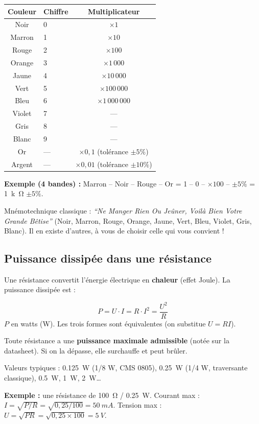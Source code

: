 \documentclass[12pt,a4paper,twoside]{book}
\begin{document}
\begin{center}
\begin{tabular}{clc}
\toprule
\textbf{Couleur} & \textbf{Chiffre} & \textbf{Multiplicateur} \\
\midrule
Noir & 0 & $\times 1$ \\
Marron & 1 & $\times 10$ \\
Rouge & 2 & $\times 100$ \\
Orange & 3 & $\times 1\,000$ \\
Jaune & 4 & $\times 10\,000$ \\
Vert & 5 & $\times 100\,000$ \\
Bleu & 6 & $\times 1\,000\,000$ \\
Violet & 7 & — \\
Gris & 8 & — \\
Blanc & 9 & — \\
Or & — & $\times 0{,}1$ (tolérance $\pm 5\%$) \\
Argent & — & $\times 0{,}01$ (tolérance $\pm 10\%$) \\
\bottomrule
\end{tabular}
\end{center}

\textbf{Exemple (4 bandes) :} Marron -- Noir -- Rouge -- Or = 1 -- 0 -- $\times100$ -- $\pm5\%$ = \SI{1}{k\ohm} $\pm 5\%$.

\begin{pratique}
Mnémotechnique classique : \textit{``Ne Manger Rien Ou Jeûner, Voilà Bien Votre Grande Bêtise''} (Noir, Marron, Rouge, Orange, Jaune, Vert, Bleu, Violet, Gris, Blanc). Il en existe d'autres, à vous de choisir celle qui vous convient !
\end{pratique}

\subsection{Puissance dissipée dans une résistance}

Une résistance convertit l'énergie électrique en \textbf{chaleur} (effet Joule). La puissance dissipée est :

\begin{formule}
\[
\boxed{P = U \cdot I = R \cdot I^2 = \frac{U^2}{R}}
\]
$P$ en watts (W). Les trois formes sont équivalentes (on substitue $U = RI$).
\end{formule}

\begin{attention}
Toute résistance a une \textbf{puissance maximale admissible} (notée sur la datasheet). Si on la dépasse, elle surchauffe et peut brûler.

Valeurs typiques : \SI{0.125}{W} (1/8 W, CMS 0805), \SI{0.25}{W} (1/4 W, traversante classique), \SI{0.5}{W}, \SI{1}{W}, \SI{2}{W}\ldots

\textbf{Exemple :} une résistance de \SI{100}{\ohm} / \SI{0.25}{W}. Courant max : $I = \sqrt{P/R} = \sqrt{0{,}25/100} = \SI{50}{mA}$. Tension max : $U = \sqrt{PR} = \sqrt{0{,}25 \times 100} = \SI{5}{V}$.
\end{attention}
\end{document}
